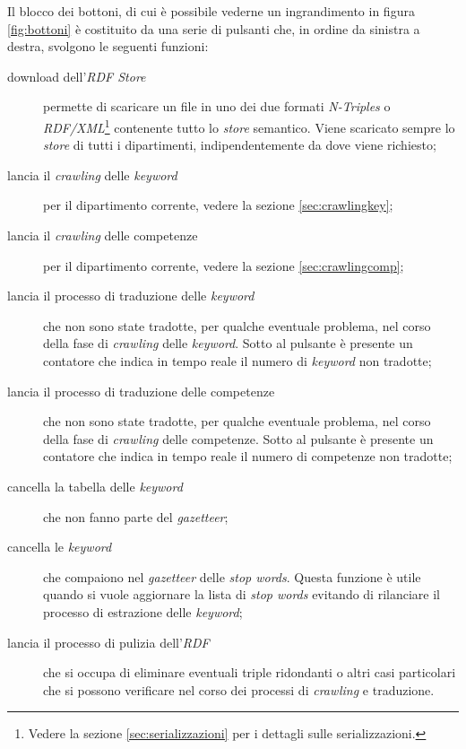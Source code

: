 \documentclass[tesi.tex]{subfiles}
\begin{document}
Il blocco dei bottoni, di cui \`e possibile vederne un ingrandimento
in figura \ref{fig:bottoni}
\`e costituito da una serie di pulsanti che, in ordine da sinistra a
destra, svolgono le seguenti funzioni:
\begin{description}
  \item[download dell'\emph{RDF Store}] permette di scaricare un file
    in uno dei due formati \emph{N-Triples} o
    \emph{RDF/XML}\footnote{Vedere la sezione
      \ref{sec:serializzazioni} per i dettagli sulle
      serializzazioni.} contenente tutto lo \emph{store} semantico. Viene scaricato sempre lo \emph{store} di tutti i
    dipartimenti, indipendentemente da dove viene richiesto;
  \item[lancia il \emph{crawling} delle \emph{keyword}] per il
    dipartimento corrente, vedere la sezione \ref{sec:crawlingkey};
  \item[lancia il \emph{crawling} delle competenze] per il
    dipartimento corrente, vedere la sezione \ref{sec:crawlingcomp};
  \item[lancia il processo di traduzione delle \emph{keyword}] che non
    sono state tradotte, per qualche eventuale problema, nel corso della
    fase di \emph{crawling} delle \emph{keyword}. Sotto al pulsante \`e
    presente un contatore che indica in tempo reale il numero di
    \emph{keyword} non tradotte;
  \item[lancia il processo di traduzione delle competenze] che non
    sono state tradotte, per qualche eventuale problema, nel corso della
    fase di \emph{crawling} delle competenze. Sotto al pulsante \`e
    presente un contatore che indica in tempo reale il numero di
    competenze non tradotte;
  \item[cancella la tabella delle \emph{keyword}] che non fanno parte
    del \emph{gazetteer};
  \item[cancella le \emph{keyword}] che compaiono nel \emph{gazetteer}
    delle \emph{stop words}. Questa funzione \`e utile quando si vuole
    aggiornare la lista di \emph{stop words} evitando di rilanciare il
    processo di estrazione delle \emph{keyword};
  \item[lancia il processo di pulizia dell'\emph{RDF}] che si occupa
    di eliminare eventuali triple ridondanti o altri casi particolari
    che si possono verificare nel corso dei processi di
    \emph{crawling} e traduzione.
\end{description}
\end{document}
